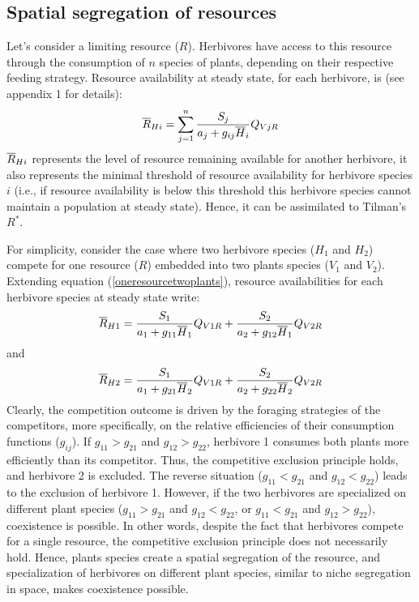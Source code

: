 \documentclass[12pt]{article}
\newcommand\barre[1]{\overline{\rule{0pt}{1.5ex}#1}}
\begin{document}
\subsection*{Spatial segregation of resources}
Let's consider a limiting resource ($R$). %
Herbivores have access to this resource through the consumption of $n$ species of plants, depending on their respective feeding strategy.   
Resource availability at steady state, for each herbivore, is (see appendix 1 for details):
\begin{equation}\label{oneresourcetwoplants}
\barre{R}_{Hi}=\sum ^n _{j=1} \frac{S_j}{a_j+g_{ij}\barre{H}_i}Q_{VjR}
\end{equation}
$\barre{R}_{Hi}$ represents the level of resource remaining available for another herbivore, it also represents the minimal threshold of resource availability for herbivore species $i$ (i.e., if resource availability is below this threshold this herbivore species cannot maintain a population at steady state). Hence, it can be assimilated to Tilman's $R^*$. \par
For simplicity, consider the case where two herbivore species ($H_1$ and $H_2$) compete for one resource ($R$) embedded into two plants species ($V_1$ and $V_2$). Extending equation (\ref{oneresourcetwoplants}), resource availabilities for each herbivore species at steady state write:
\begin{equation}
\barre{R}_{H1}=\frac{S_1}{a_1+g_{11}\barre{H}_1}Q_{V1R}+\frac{S_2}{a_2+g_{12}\barre{H}_1}Q_{V2R}
\end{equation}
and
\begin{equation}
\barre{R}_{H2}=\frac{S_1}{a_1+g_{21}\barre{H}_2}Q_{V1R}+\frac{S_2}{a_2+g_{22}\barre{H}_2}Q_{V2R}
\end{equation}
Clearly, the competition outcome is driven by the foraging strategies of the competitors, more specifically, on the relative efficiencies of their consumption functions ($g_{ij}$). If $g_{11}>g_{21}$ and $g_{12}>g_{22}$, herbivore 1 consumes both plants more efficiently than its competitor. Thus, the competitive exclusion principle holds, and herbivore 2 is excluded. The reverse situation ($g_{11}<g_{21}$ and $g_{12}<g_{22}$) leads to the exclusion of herbivore 1. However, if the two herbivores are specialized on different plant species ($g_{11}>g_{21}$ and $g_{12}<g_{22}$, or  $g_{11}<g_{21}$ and $g_{12}>g_{22}$), coexistence is possible. In other words, despite the fact that herbivores compete for a single resource, the competitive exclusion principle does not necessarily hold. Hence, plants species create a spatial segregation of the resource, and specialization of herbivores on different plant species, similar to niche segregation in space, makes coexistence possible.%
\end{document}

